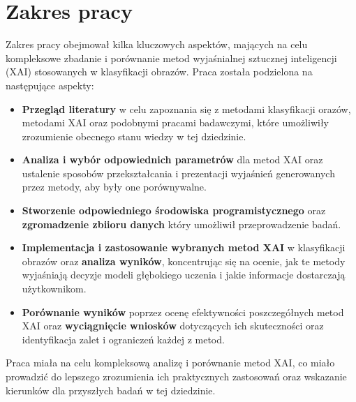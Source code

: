 \section*{Zakres pracy}
Zakres pracy obejmował kilka kluczowych aspektów, mających na celu kompleksowe zbadanie i porównanie metod wyjaśnialnej sztucznej inteligencji (XAI) stosowanych w klasyfikacji obrazów.
Praca została podzielona na następujące aspekty:
\begin{itemize}
  \item \textbf{Przegląd literatury} w celu zapoznania się z metodami klasyfikacji orazów, metodami XAI oraz podobnymi pracami badawczymi, które umożliwiły zrozumienie obecnego stanu wiedzy w tej dziedzinie. 
  \item \textbf{Analiza i wybór odpowiednich parametrów} dla metod XAI oraz ustalenie sposobów przekształcania i prezentacji wyjaśnień generowanych przez metody, aby były one porównywalne.
  \item \textbf{Stworzenie odpowiedniego środowiska programistycznego} oraz \textbf{zgromadzenie zbiioru danych} który umożliwił przeprowadzenie badań. 
  \item \textbf{Implementacja i zastosowanie wybranych metod XAI} w klasyfikacji obrazów oraz \textbf{analiza wyników}, koncentrując się na ocenie, jak te metody wyjaśniają decyzje modeli głębokiego uczenia i jakie informacje dostarczają użytkownikom.
  \item \textbf{Porównanie wyników} poprzez ocenę efektywności poszczegółnych metod XAI oraz \textbf{wyciągnięcie wniosków} dotyczących ich skuteczności oraz identyfikacja zalet i ograniczeń każdej z metod.
\end{itemize}

Praca miała na celu kompleksową analizę i porównanie metod XAI, co miało prowadzić do lepszego zrozumienia ich praktycznych zastosowań oraz wskazanie kierunków dla przyszłych badań w tej dziedzinie.
